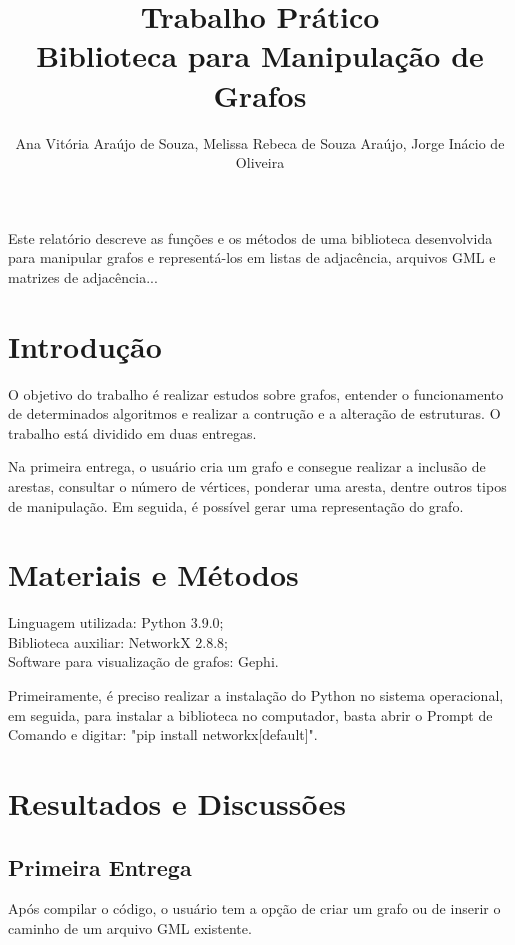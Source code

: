 \documentclass[12pt]{article}
\title{Trabalho Prático\\ Biblioteca para Manipulação de Grafos}
\author{Ana Vitória Araújo de Souza, Melissa Rebeca de Souza Araújo, Jorge Inácio de Oliveira}
\begin{document}
 

\maketitle

\begin{resumo} 
  Este relatório descreve as funções e os métodos de uma biblioteca desenvolvida para manipular grafos e representá-los em listas de adjacência, arquivos GML e matrizes de adjacência...
\end{resumo}


\section{Introdução} \label{sec:firstpage}

O objetivo do trabalho é realizar estudos sobre grafos, entender o funcionamento de determinados algoritmos e realizar a contrução e a alteração de estruturas. O trabalho está dividido em duas entregas.

Na primeira entrega, o usuário cria um grafo e consegue realizar a inclusão de arestas, consultar o número de vértices, ponderar uma aresta, dentre outros tipos de manipulação. Em seguida, é possível gerar uma representação do grafo.

\section{Materiais e Métodos}

Linguagem utilizada: Python 3.9.0;\\ 
Biblioteca auxiliar: NetworkX 2.8.8;\\
Software para visualização de grafos: Gephi.

Primeiramente, é preciso realizar a instalação do Python no sistema operacional, em seguida, para instalar a biblioteca no computador, basta abrir o Prompt de Comando e digitar: "pip install networkx[default]".

\section{Resultados e Discussões}
\subsection{Primeira Entrega}

Após compilar o código, o usuário tem a opção de criar um grafo ou de inserir o caminho de um arquivo GML existente.
\end{document}
